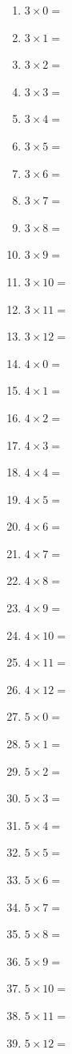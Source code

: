 \documentclass{article}
\begin{document}
\begin{multicols}{4}
\begin{enumerate}
\item $3 \times 0 =$
\item $3 \times 1 =$
\item $3 \times 2 =$
\item $3 \times 3 =$
\item $3 \times 4 =$
\item $3 \times 5 =$
\item $3 \times 6 =$
\item $3 \times 7 =$
\item $3 \times 8 =$
\item $3 \times 9 =$
\item $3 \times 10 =$
\item $3 \times 11 =$
\item $3 \times 12 =$

\item $4 \times 0 =$
\item $4 \times 1 =$
\item $4 \times 2 =$
\item $4 \times 3 =$
\item $4 \times 4 =$
\item $4 \times 5 =$
\item $4 \times 6 =$
\item $4 \times 7 =$
\item $4 \times 8 =$
\item $4 \times 9 =$
\item $4 \times 10 =$
\item $4 \times 11 =$
\item $4 \times 12 =$

\item $5 \times 0 =$
\item $5 \times 1 =$
\item $5 \times 2 =$
\item $5 \times 3 =$
\item $5 \times 4 =$
\item $5 \times 5 =$
\item $5 \times 6 =$
\item $5 \times 7 =$
\item $5 \times 8 =$
\item $5 \times 9 =$
\item $5 \times 10 =$
\item $5 \times 11 =$
\item $5 \times 12 =$


\end{enumerate}
\end{multicols}
\end{document}
